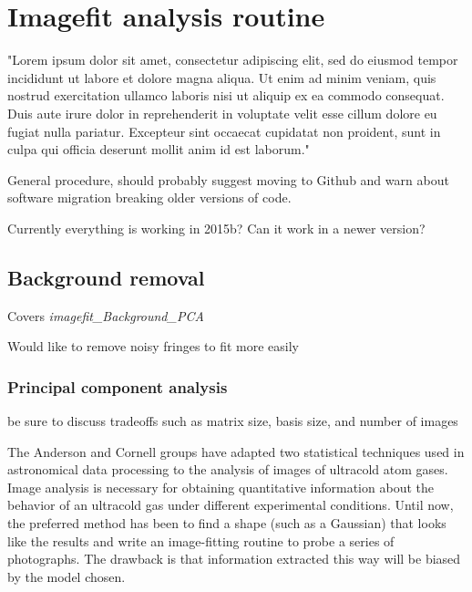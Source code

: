 \chapter{Imagefit analysis routine} \label{app:imagefitManual}
"Lorem ipsum dolor sit amet, consectetur adipiscing elit, sed do eiusmod tempor incididunt ut labore et dolore magna aliqua. Ut enim ad minim veniam, quis nostrud exercitation ullamco laboris nisi ut aliquip ex ea commodo consequat. Duis aute irure dolor in reprehenderit in voluptate velit esse cillum dolore eu fugiat nulla pariatur. Excepteur sint occaecat cupidatat non proident, sunt in culpa qui officia deserunt mollit anim id est laborum."

General procedure, should probably suggest moving to Github and warn about software migration breaking older versions of code.

Currently everything is working in 2015b? Can it work in a newer version?

\section{Background removal}

Covers \emph{imagefit\_Background\_PCA}

Would like to remove noisy fringes to fit more easily

\subsection{Principal component analysis}

be sure to discuss tradeoffs such as matrix size, basis size, and number of images

The Anderson and Cornell groups have adapted two statistical techniques used in astronomical data processing to the analysis of images of ultracold atom gases. Image analysis is necessary for obtaining quantitative information about the behavior of an ultracold gas under different experimental conditions. Until now, the preferred method has been to find a shape (such as a Gaussian) that looks like the results and write an image-fitting routine to probe a series of photographs. The drawback is that information extracted this way will be biased by the model chosen.

